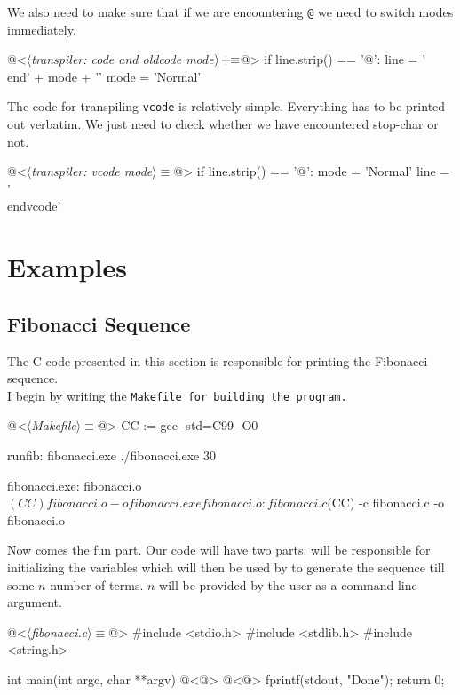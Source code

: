 We also need to make sure that if we are encountering \verb|@| we need to switch modes immediately.

\begin{oldcode}
@<$\langle$\textit{transpiler: code and oldcode mode}$\rangle \thinspace +\!\!\equiv$@>
if line.strip() == '@':
    line = '\\end{' + mode + '}\n'
    mode = 'Normal'

\end{oldcode}

The code for transpiling \texttt{vcode} is relatively simple. Everything has to be printed out verbatim. We
just need to check whether we have encountered stop-char or not.

\begin{code}
@<$\langle$\textit{transpiler: vcode mode}$\rangle\equiv$@>
if line.strip() == '@':
    mode = 'Normal'
    line = '\\end{vcode}\n'

\end{code}
\section{Examples}
\subsection{Fibonacci Sequence}
The C code presented in this section is responsible for printing the Fibonacci sequence.\\

I begin by writing the \tt Makefile \rm for building the program.
\begin{code}[Makefile]
@<$\langle$\textit{Makefile}$\rangle\equiv$@>
CC := gcc -std=C99 -O0

runfib: fibonacci.exe
    ./fibonacci.exe 30

fibonacci.exe: fibonacci.o
    $(CC) fibonacci.o -o fibonacci.exe

fibonacci.o: fibonacci.c
    $(CC) -c fibonacci.c -o fibonacci.o
\end{code}

Now comes the fun part. Our code will have two parts:  will be responsible for
initializing the variables which will then be used by  to generate
the sequence till some $n$ number of terms. $n$ will be provided by the user as a command line argument.

\begin{code}[fibonacci.c]
@<$\langle$\textit{fibonacci.c}$\rangle\equiv$@>
#include <stdio.h>
#include <stdlib.h>
#include <string.h>

int main(int argc, char **argv)
{
    @<@>
    @<@>
    fprintf(stdout, "Done\n");
    return 0;
}
\end{code}

